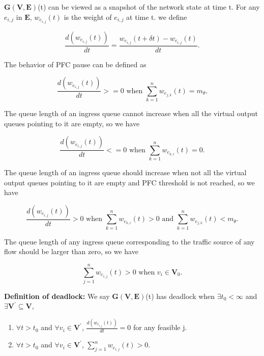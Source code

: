 $\textbf{G}(\textbf{V},\textbf{E})$(t) can be viewed as a snapshot of the network state at time t. For any $e_{i,j}$ in $\textbf{E}$, $w_{e_{i,j}}(t)$ is the weight of $e_{i,j}$ at time t. we define

\begin{equation}\label{eq:1}
 \frac{d(w_{e_{i,j}}(t))}{dt} = \frac{w_{e_{i,j}}(t+\delta t)-w_{e_{i,j}}(t)}{dt}.
\end{equation}

The behavior of PFC pause can be defined as

\begin{equation}\label{eq:2}
 \frac{d(w_{e_{i,j}}(t))}{dt} >= 0 \text{ when } \sum_{k=1}^{n} w_{e_{j,k}}(t) = m_{\theta} .
\end{equation}

The queue length of an ingress queue cannot increase when all the virtual output queues pointing to it are empty, so we have

\begin{equation}\label{eq:3}
 \frac{d(w_{e_{i,j}}(t))}{dt} <= 0 \text{ when } \sum_{k=1}^{n} w_{e_{k,i}}(t) = 0.
\end{equation}

The queue length of an ingress queue should increase when not all the virtual output queues pointing to it are empty and PFC threshold is not reached, so we have

\begin{equation}\label{eq:4}
 \frac{d(w_{e_{i,j}}(t))}{dt} > 0 \text{ when } \sum_{k=1}^{n} w_{e_{k,i}}(t) > 0 \text{ and } \sum_{k=1}^{n} w_{e_{j,k}}(t) < m_{\theta}.
\end{equation}

The queue length of any ingress queue corresponding to the traffic source of any flow should be larger than zero, so we have

\begin{equation}\label{eq:5}
 \sum_{j=1}^{n} w_{e_{i,j}}(t) > 0 \text{ when } v_i \in \textbf{V}_0.
\end{equation}

\textbf{Definition of deadlock:} We say $\textbf{G}(\textbf{V},\textbf{E})$(t) has deadlock when $\exists t_0<\infty$ and $\exists \textbf{V}^\prime \subseteq \textbf{V}$,
\begin{enumerate}
 \item $\forall t > t_0$ and $\forall v_i \in \textbf{V}^\prime$, $\frac{d(w_{e_{i,j}}(t))}{dt}=0$ for any feasible j.
 \item $\forall t > t_0$ and $\forall v_i \in \textbf{V}^\prime$, $\sum_{j=1}^{n} w_{e_{i,j}}(t) > 0$.
\end{enumerate}

